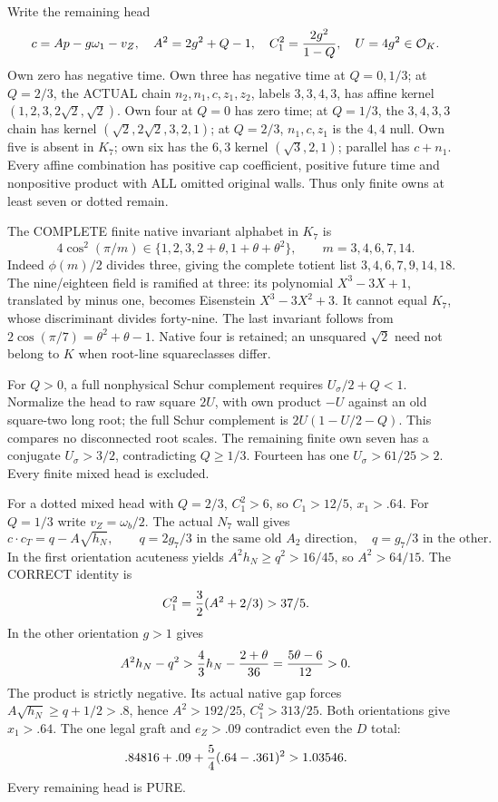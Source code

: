 Write the remaining head
\[
 c=Ap-g\omega_1-v_Z,\quad
 A^2=2g^2+Q-1,\quad
 C_1^2={2g^2\over1-Q},\quad U=4g^2\in\mathcal O_K.
\]
Own zero has negative time.
Own three has negative time at \(Q=0,1/3\);
at \(Q=2/3\), the ACTUAL chain
\(n_2,n_1,c,z_1,z_2\), labels \(3,3,4,3\),
has affine kernel \((1,2,3,2\sqrt2,\sqrt2)\).
Own four at \(Q=0\) has zero time;
at \(Q=1/3\), the \(3,4,3,3\) chain has kernel
\((\sqrt2,2\sqrt2,3,2,1)\);
at \(Q=2/3\), \(n_1,c,z_1\) is the \(4,4\) null.
Own five is absent in \(K_7\); own six has the
\(6,3\) kernel \((\sqrt3,2,1)\);
parallel has \(c+n_1\).
Every affine combination has positive cap coefficient,
positive future time and nonpositive product with
ALL omitted original walls.
Thus only finite owns at least seven or dotted remain.

The COMPLETE finite native invariant alphabet in \(K_7\) is
\[
           4\cos^2(\pi/m)\in
             \{1,2,3,2+\theta,1+\theta+\theta^2\},
 \qquad m=3,4,6,7,14 .
\tag{TA}\label{eq:arithK7native}
\]
Indeed \(\phi(m)/2\) divides three, giving the
complete totient list \(3,4,6,7,9,14,18\).
The nine/eighteen field is ramified at three:
its polynomial \(X^3-3X+1\), translated by minus one,
becomes Eisenstein \(X^3-3X^2+3\).
It cannot equal \(K_7\), whose discriminant divides
forty-nine.
The last invariant follows from
\(2\cos(\pi/7)=\theta^2+\theta-1\).
Native four is retained; an unsquared \(\sqrt2\)
need not belong to \(K\) when root-line squareclasses differ.

For \(Q>0\), a full nonphysical Schur complement
requires \(U_\sigma/2+Q<1\).
Normalize the head to raw square \(2U\), with own
product \(-U\) against an old square-two long root;
the full Schur complement is \(2U(1-U/2-Q)\).
This compares no disconnected root scales.
The remaining finite own seven has a conjugate
\(U_\sigma>3/2\), contradicting \(Q\ge1/3\).
Fourteen has one \(U_\sigma>61/25>2\).
Every finite mixed head is excluded.

For a dotted mixed head with \(Q=2/3\),
\(C_1^2>6\), so \(C_1>12/5\), \(x_1>.64\).
For \(Q=1/3\) write \(v_Z=\omega_b/2\).
The actual \(N_7\) wall gives
\[
 c\cdot c_T=q-A\sqrt{h_N},\qquad
 q=2g_7/3\text{ in the same old }A_2\text{ direction},
 \quad q=g_7/3\text{ in the other}.
\]
In the first orientation acuteness yields
\(A^2h_N\ge q^2>16/45\), so \(A^2>64/15\).
The CORRECT identity is
\[
                         C_1^2={3\over2}(A^2+2/3)>37/5 .
\]
In the other orientation \(g>1\) gives
\[
 A^2h_N-q^2>{4\over3}h_N-{2+\theta\over36}
                  ={5\theta-6\over12}>0 .
\]
The product is strictly negative.
Its actual native gap forces
\(A\sqrt{h_N}\ge q+1/2>.8\), hence
\(A^2>192/25\), \(C_1^2>313/25\).
Both orientations give \(x_1>.64\).
The one legal graft and \(e_Z>.09\) contradict
even the \(D\) total:
\[
                  .84816+.09+{5\over4}(.64-.361)^2>1.03546 .
\]
Every remaining head is PURE.

